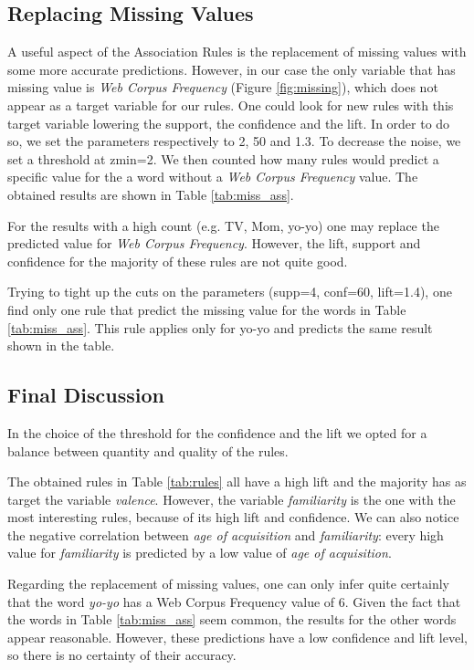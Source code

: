 \documentclass[a4paper,11pt,dvipsnames]{article}
\begin{document}
\subsection{Replacing Missing Values}
A useful aspect of the Association Rules is the replacement of missing values with some more accurate predictions. However, in our case the only variable that has missing value is \textit{Web Corpus Frequency} (Figure \ref{fig:missing}), which does not appear as a target variable for our rules. One could look for new rules with this target variable lowering the support, the confidence and the lift. In order to do so, we set the parameters respectively to 2, 50 and 1.3. To decrease the noise, we set a threshold at zmin=2. We then counted how many rules would predict a specific value for the a word without a \textit{Web Corpus Frequency} value. The obtained results are shown in Table \ref{tab:miss_ass}.


For the results with a high count (e.g. TV, Mom, yo-yo) one may replace the predicted value for \textit{Web Corpus Frequency}. However, the lift, support and confidence for the majority of these rules are not quite good.

Trying to tight up the cuts on the parameters (supp=4, conf=60, lift=1.4), one find only one rule that predict the missing value for the words in Table \ref{tab:miss_ass}. This rule applies only for yo-yo and predicts the same result shown in the table.


\subsection{Final Discussion}

In the choice of the threshold for the confidence and the lift we opted for a balance between quantity and quality of the rules. 

The obtained rules in Table \ref{tab:rules} all have a high lift and the majority has as target the variable \textit{valence}. However, the variable \textit{familiarity} is the one with the most interesting rules, because of its high lift and confidence. We can also notice the negative correlation between \textit{age of acquisition} and \textit{familiarity}: every high value for \textit{familiarity} is predicted by a low value of \textit{age of acquisition}.

Regarding the replacement of missing values, one can only infer quite certainly that the word \textit{yo-yo} has a Web Corpus Frequency value of 6. Given the fact that the words in Table \ref{tab:miss_ass} seem common, the results for the other words appear reasonable. However, these predictions have a low confidence and lift level, so there is no certainty of their accuracy.
\end{document}
